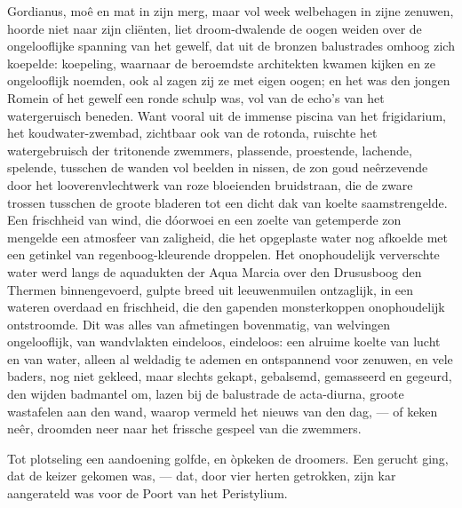 \documentclass[a4paper, 12pt, oneside, dutch]{article}
\begin{document}
Gordianus, moê en mat in zijn merg, maar vol week welbehagen in zijne zenuwen, hoorde niet naar zijn cliënten, liet droom-dwalende de oogen weiden over de ongelooflijke spanning van het gewelf, dat uit de bronzen balustrades omhoog zich koepelde: koepeling, waarnaar de beroemdste architekten kwamen kijken en ze ongelooflijk noemden, ook al zagen zij ze met eigen oogen; en het was den jongen Romein of het gewelf een ronde schulp was, vol van de echo's van het watergeruisch beneden. Want vooral uit de immense piscina van het frigidarium, het koudwater-zwembad, zichtbaar ook van de rotonda, ruischte het watergebruisch der tritonende zwemmers, plassende, proestende, lachende, spelende, tusschen de wanden vol beelden in nissen, de zon goud neêrzevende door het looverenvlechtwerk van roze bloeienden bruidstraan, die de zware trossen tusschen de groote bladeren tot een dicht dak van koelte saamstrengelde. Een frischheid van wind, die dóorwoei en een zoelte van getemperde zon mengelde een atmosfeer van zaligheid, die het opgeplaste water nog afkoelde met een getinkel van regenboog-kleurende droppelen. Het onophoudelijk ververschte water werd langs de aquadukten der Aqua Marcia over den Drususboog den Thermen binnengevoerd, gulpte breed uit leeuwenmuilen ontzaglijk, in een wateren overdaad en frischheid, die den gapenden monsterkoppen onophoudelijk ontstroomde. Dit was alles van afmetingen bovenmatig, van welvingen ongelooflijk, van wandvlakten eindeloos, eindeloos: een alruime koelte van lucht en van water, alleen al weldadig te ademen en ontspannend voor zenuwen, en vele baders, nog niet gekleed, maar slechts gekapt, gebalsemd, gemasseerd en gegeurd, den wijden badmantel om, lazen bij de balustrade de acta-diurna, groote wastafelen aan den wand, waarop vermeld het nieuws van den dag, --- of keken neêr, droomden neer naar het frissche gespeel van die zwemmers.

Tot plotseling een aandoening golfde, en òpkeken de droomers. Een gerucht ging, dat de keizer gekomen was, --- dat, door vier herten getrokken, zijn kar aangerateld was voor de Poort van het Peristylium.
\end{document}
